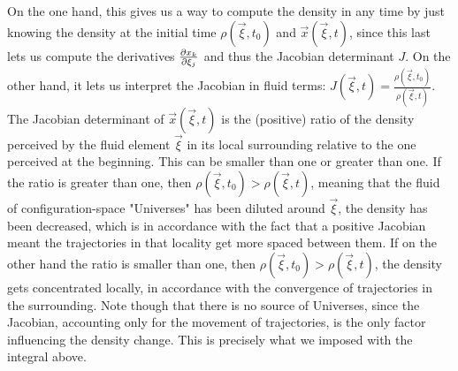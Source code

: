 \documentclass[11pt, a4paper]{article} %
\begin{document}
On the one hand, this gives us a way to compute the density in any time by just knowing the density at the initial time $\rho(\vec{\xi},t_0)$ and $\vec{x}(\vec{\xi},t)$, since this last lets us compute the derivatives $\pdv{x_k}{\xi_j}$ and thus the Jacobian determinant $J$. On the other hand, it lets us interpret the Jacobian in fluid terms: $J(\vec{\xi},t)=\frac{\rho(\vec{\xi},t_0)}{\rho(\vec{\xi},t)}$. The Jacobian determinant of $\vec	{x}(\vec{\xi},t)$ is the (positive) ratio of the density perceived by the fluid element $\vec{\xi}$ in its local surrounding relative to the one perceived at the beginning. This can be smaller than one or greater than one. If the ratio is greater than one, then $\rho(\vec{\xi},t_0)>\rho(\vec{\xi},t)$, meaning that the fluid of configuration-space "Universes" has been diluted around $\vec{\xi}$, the density has been decreased, which is in accordance with the fact that a positive Jacobian meant the trajectories in that locality get more spaced between them. If on the other hand the ratio is smaller than one, then $\rho(\vec{\xi},t_0)>\rho(\vec{\xi},t)$, the density gets concentrated locally, in accordance with the convergence of trajectories in the surrounding. Note though that there is no source of Universes, since the Jacobian, accounting only for the movement of trajectories, is the only factor influencing the density change. This is precisely what we imposed with the integral above.
\end{document}
